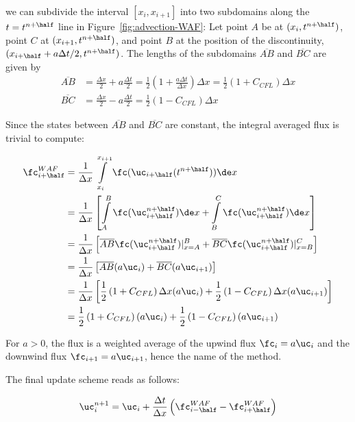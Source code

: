 we can subdivide the interval $[x_i, x_{i+1}]$ into two subdomains along the $t = t^{n + \half}$
line in Figure~\ref{fig:advection-WAF}: Let point $A$ be at $(x_i, t^{n+\half})$, point $C$ at
$(x_{i+1}, t^{n+\half})$, and point $B$ at the position of the discontinuity, $(x_{i+\half}+a
\Delta t / 2, t^{n+\half})$. The lengths of the subdomains $\overline{AB}$ and $\overline{BC}$ are
given by
\begin{align}
    \overline{AB} &= \frac{\Delta x}{2} + a \frac{\Delta t}{2}
        = \frac{1}{2}\left(1 + \frac{a \Delta t}{\Delta x}\right) \Delta x
        = \frac{1}{2}\left(1 + C_{CFL} \right) \Delta x  \\
    \overline{BC} &= \frac{\Delta x}{2} - a \frac{\Delta t}{2}
        = \frac{1}{2}\left(1 - C_{CFL} \right) \Delta x
\end{align}


Since the states between
$\overline{AB}$ and $\overline{BC}$ are constant, the integral averaged flux is trivial to compute:

\begin{align}
\fc_{i+\half}^{WAF}
    &= \frac{1}{\Delta x} \int\limits_{x_i}^{x_{i+1}} \fc(\uc_{i+\half}( t^{n+\half})) \de x \\
    &= \frac{1}{\Delta x} \left[
    \int\limits_{A}^{B} \fc(\uc_{i+\half}^{n+\half}) \de x +
    \int\limits_{B}^{C} \fc(\uc_{i+\half}^{n+\half}) \de x
    \right] \\
    &= \frac{1}{\Delta x} \left[
    \overline{AB} \fc(\uc_{i+\half}^{n+\half}) |_{x = A}^B +
    \overline{BC} \fc(\uc_{i+\half}^{n+\half}) |_{x = B}^C
    \right] \\
    &= \frac{1}{\Delta x} \left[
    \overline{AB} (a \uc_i) + \overline{BC} (a \uc_{i+1})
    \right] \\
    &= \frac{1}{\Delta x} \left[
        \frac{1}{2}\left(1 + C_{CFL} \right) \Delta x (a \uc_i) +
        \frac{1}{2}\left(1 - C_{CFL} \right) \Delta x  (a \uc_{i+1})
    \right] \\
    &=  \frac{1}{2}\left(1 + C_{CFL} \right) (a \uc_i) +
        \frac{1}{2}\left(1 - C_{CFL} \right) (a \uc_{i+1}) \label{eq:WAF-flux}
\end{align}

For $a > 0$, the flux is a weighted average of the upwind flux $\fc_i = a \uc_i$ and the downwind
flux $\fc_{i+1} = a \uc_{i+1}$, hence the name of the method.

The final update scheme reads as follows:

\begin{align}
    \uc_{i}^{n+1} =
        \uc_i + \frac{\Delta t}{\Delta x}\left(\fc_{i-\half}^{WAF} - \fc_{i+\half}^{WAF} \right)
\end{align}


